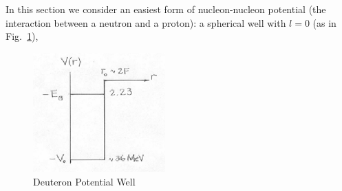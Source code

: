 \documentclass{school-22.101-notes}
\date{October 19, 2011}
\begin{document}
\maketitle


In this section we consider an easiest form of nucleon-nucleon potential (the interaction between a neutron and a proton): a spherical well with $l=0$ (as in Fig.~\ref{deuteron-potential}), 
\begin{figure}[h!]
    \centering
    \includegraphics[width=2in]{images/deuteron/deuteron-potential.png}
    \caption{Deuteron Potential Well} \label{deuteron-potential}
\end{figure}
\end{document}
